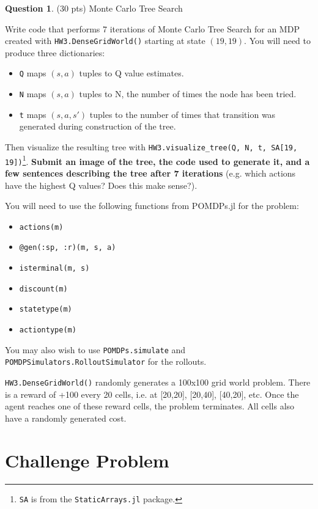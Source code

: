 \documentclass{article}
\theoremstyle{definition}
\newtheorem{question}[thm]{Question}
\begin{document}
\begin{question}\label{q:mcts}
    (30 pts) Monte Carlo Tree Search
    
    Write code that performs 7 iterations of Monte Carlo Tree Search for an MDP created with \texttt{HW3.DenseGridWorld()} starting at state $(19, 19)$. You will need to produce three dictionaries:
    \begin{itemize}[noitemsep]
        \item \texttt{Q} maps $(s, a)$ tuples to Q value estimates.
        \item \texttt{N} maps $(s, a)$ tuples to N, the number of times the node has been tried.
        \item \texttt{t} maps $(s, a, s')$ tuples to the number of times that transition was generated during construction of the tree.
    \end{itemize}
    Then visualize the resulting tree with \texttt{HW3.visualize\_tree(Q, N, t, SA[19, 19])}\footnote{\texttt{SA} is from the \texttt{StaticArrays.jl} package.}. \textbf{Submit an image of the tree, the code used to generate it, and a few sentences describing the tree after 7 iterations} (e.g. which actions have the highest Q values? Does this make sense?).
    
    You will need to use the following functions from POMDPs.jl for the problem:
    \begin{itemize}[noitemsep]
        \item \texttt{actions(m)}
        \item \texttt{@gen(:sp, :r)(m, s, a)}
        \item \texttt{isterminal(m, s)}
        \item \texttt{discount(m)}
        \item \texttt{statetype(m)}
        \item \texttt{actiontype(m)}
    \end{itemize}

    You may also wish to use \texttt{POMDPs.simulate} and \texttt{POMDPSimulators.RolloutSimulator} for the rollouts.

    \texttt{HW3.DenseGridWorld()} randomly generates a 100x100 grid world problem. There is a reward of +100 every 20 cells, i.e. at [20,20], [20,40], [40,20], etc. Once the agent reaches one of these reward cells, the problem terminates. All cells also have a randomly generated cost.
\end{question}

\section{Challenge Problem}
\end{document}

